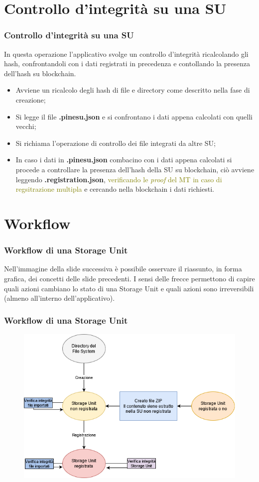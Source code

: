 \documentclass{beamer}
\begin{document}
\section{Controllo d'integrità su una SU}
\begin{frame}
	\frametitle{Controllo d'integrità su una SU}
	In questa operazione l'applicativo svolge un controllo d'integrità ricalcolando gli hash, confrontandoli con i dati registrati in precedenza e contollando la presenza dell'hash su blockchain.
	\begin{itemize}
		\item Avviene un ricalcolo degli hash di file e directory come descritto nella fase di creazione;
		\item Si legge il file \textbf{.pinesu.json} e si confrontano i dati appena calcolati con quelli vecchi;
		\item Si richiama l'operazione di controllo dei file integrati da altre SU;
		\item In caso i dati in \textbf{.pinesu.json} combacino con i dati appena calcolati si procede a controllare la presenza dell'hash della SU su blockchain, ciò avviene leggendo \textbf{.registration.json}, \textcolor{olive}{verificando le \emph{proof} del MT in caso di regsitrazione multipla} e cercando nella blockchain i dati richiesti.
	\end{itemize}
\end{frame}
\section{Workflow}
\begin{frame}
	\frametitle{Workflow di una Storage Unit}
	Nell'immagine della slide successiva è possibile osservare il riassunto, in forma grafica, dei concetti delle slide precedenti.
	I sensi delle frecce permettono di capire quali azioni cambiano lo stato di una Storage Unit e quali azioni sono irreversibili (almeno all'interno dell'applicativo).
\end{frame}
\begin{frame}
	\frametitle{Workflow di una Storage Unit}
	\begin{figure}
		\includegraphics[width=\textwidth]{figures/WorkflowSU.png}
	\end{figure}
\end{frame}
\end{document}
